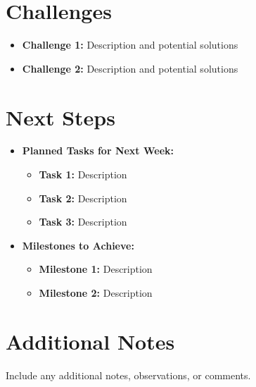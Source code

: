 \documentclass[12pt]{article}
\begin{document}
\section*{Challenges}
\begin{itemize}[leftmargin=*]
    \item \textbf{Challenge 1:} Description and potential solutions
    \item \textbf{Challenge 2:} Description and potential solutions
\end{itemize}

\section*{Next Steps}
\begin{itemize}
    \item \textbf{Planned Tasks for Next Week:}
    \begin{itemize}[leftmargin=*]
        \item \textbf{Task 1:} Description
        \item \textbf{Task 2:} Description
        \item \textbf{Task 3:} Description
    \end{itemize}
    \item \textbf{Milestones to Achieve:}
    \begin{itemize}[leftmargin=*]
        \item \textbf{Milestone 1:} Description
        \item \textbf{Milestone 2:} Description
    \end{itemize}
\end{itemize}

\section*{Additional Notes}
Include any additional notes, observations, or comments.
\end{document}
